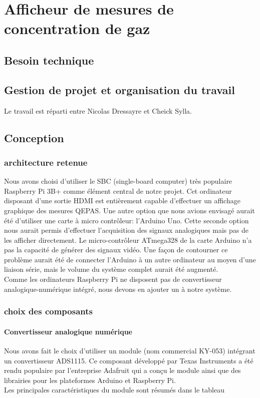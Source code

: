 \documentclass[a4paper]{report}
\begin{document}
	\chapter{Afficheur de mesures de concentration de gaz}
	
	
	\section{Besoin technique}
	
	\section{Gestion de projet et organisation du travail}
	Le travail est réparti entre Nicolas Dressayre et Cheick Sylla. 
	
	\section{Conception}
	\subsection{architecture retenue}
	Nous avons choisi d'utiliser le SBC (single-board computer) très populaire Raspberry Pi 3B+ comme élément central de notre projet. Cet ordinateur disposant d'une sortie HDMI est entièrement capable d'effectuer un affichage graphique des mesures QEPAS. Une autre option que nous avions envisagé aurait été d'utiliser une carte à micro contrôleur: l'Arduino Uno. Cette seconde option nous aurait permis d'effectuer l'acquisition des signaux analogiques mais pas de les afficher directement. Le micro-contrôleur ATmega328 de la carte Arduino n'a pas la capacité de générer des signaux vidéo. Une façon de contourner ce problème aurait été de connecter l'Arduino à un autre ordinateur au moyen d'une liaison série, mais le volume du système complet aurait été augmenté.\\
	
	Comme les ordinateurs Raspberry Pi ne disposent pas de convertisseur analogique-numérique intégré, nous devons en ajouter un à notre système.\\
	

	
	\subsection{choix des composants}
	
\subsubsection{Convertisseur analogique numérique}
	Nous avons fait le choix d'utiliser un module (nom commercial KY-053) intégrant un convertisseur ADS1115. Ce composant développé par Texas Instruments a été rendu populaire par l'entreprise Adafruit qui a conçu le module ainsi que des librairies pour les plateformes Arduino et Raspberry Pi.\\
	Les principales caractéristiques du module sont résumés dans le tableau 
\end{document}
